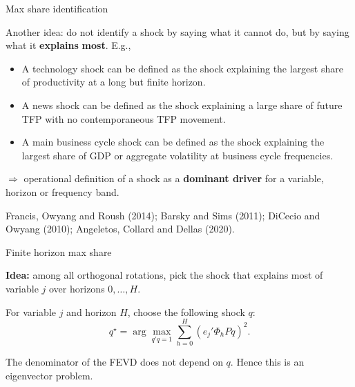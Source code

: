 \documentclass{beamer}
\begin{document}
\begin{frame}{Max share identification}
\small

Another idea: do not identify a shock by saying what it cannot do, but by saying what it \textbf{explains} \textbf{most}. E.g.,

\medskip

\begin{itemize}\itemsep5pt
  \item A technology shock can be defined as the shock explaining the largest share of productivity at a long but finite horizon.
  \item A news shock can be defined as the shock explaining a large share of future TFP with no contemporaneous TFP movement.
  \item A main business cycle shock can be defined as the shock explaining the largest share of GDP or aggregate volatility at business cycle frequencies.
\end{itemize}

\medskip

$\Longrightarrow$ operational definition of a shock as a \textbf{dominant driver} for a variable, horizon or frequency band.

\medskip

\footnotesize Francis, Owyang and Roush (2014); Barsky and Sims (2011); DiCecio and Owyang (2010); Angeletos, Collard and Dellas (2020).

\end{frame}


\begin{frame}{Finite horizon max share}
\small

\textbf{Idea:} among all orthogonal rotations, pick the shock that explains most of variable $j$ over horizons $0,\ldots,H$.

\medskip

For variable $j$ and horizon $H$, choose the following shock $q$:
\[
q^\star = \arg\max_{q'q=1}
\sum_{h=0}^{H}\left(e_j'\Phi_hPq\right)^2.
\]

\medskip

The denominator of the FEVD does not depend on $q$. Hence this is an eigenvector problem.



\end{frame}
\end{document}
